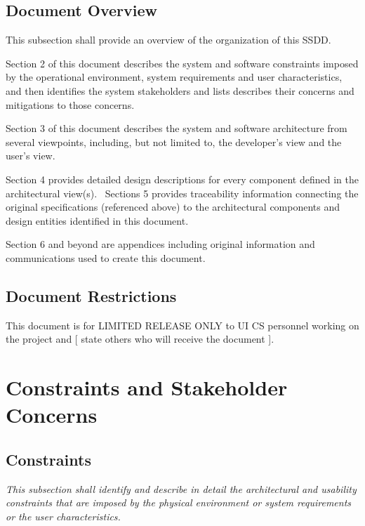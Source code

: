 \documentclass[twoside,letterpaper]{article}
\begin{document}
\subsection{Document Overview}
This subsection shall provide an overview of the organization of this
SSDD.

Section 2 of this document describes the system and software constraints
imposed by the operational environment, system requirements and user
characteristics, and then identifies the system stakeholders and lists
describes their concerns and mitigations to those concerns.

Section 3 of this document describes the system and software
architecture from several viewpoints, including, but not limited to,
the developer{\textquoteright}s view and the user{\textquoteright}s
view.

Section 4 provides detailed design descriptions for every component
defined in the architectural view(s). \ Sections 5 provides
traceability information connecting the original specifications
(referenced above) to the architectural components and design entities
identified in this document.

Section 6 and beyond are appendices including original information and
communications used to create this document.

\subsection{Document Restrictions}
This document is for LIMITED RELEASE ONLY to UI CS personnel working on
the project and [ state others who will receive the document ].

\section{Constraints and Stakeholder Concerns}

\subsection{Constraints}
{\itshape\color{black}
This subsection shall identify and describe in detail the architectural
and usability constraints that are imposed by the physical environment
or system requirements or the user characteristics.}
\end{document}
